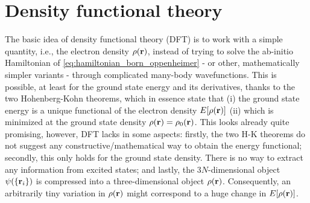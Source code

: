 \documentclass[../../main.tex]{subfiles}
\begin{document}
\section{Density functional theory}\label{sec:dft}

The basic idea of density functional theory (DFT) is to work with a simple quantity, i.e., the electron density $\rho(\textbf{r})$, instead of trying to solve the ab-initio Hamiltonian of \eqref{eq:hamiltonian_born_oppenheimer} - or other, mathematically simpler variants - through complicated many-body wavefunctions. This is possible, at least for the ground state energy and its derivatives, thanks to the two Hohenberg-Kohn theorems, which in essence state that (i) the ground state energy is a unique functional of the electron density $E[\rho(\textbf{r})]$ (ii) which is minimized at the ground state density $\rho(\textbf{r})=\rho_0(\textbf{r})$. This looks already quite promising, however, DFT lacks in some aspects: firstly, the two H-K theorems do not suggest any constructive/mathematical way to obtain the energy functional; secondly, this only holds for the ground state density. There is no way to extract any information from excited states; and lastly, the $3N$-dimensional object $\psi(\{\textbf{r}_i\})$ is compressed into a three-dimensional object $\rho(\textbf{r})$. Consequently, an arbitrarily tiny variation in $\rho(\textbf{r})$ might correspond to a huge change in $E[\rho(\textbf{r})]$.
\end{document}
